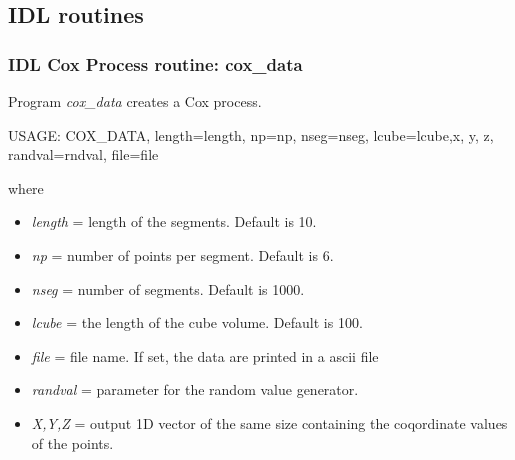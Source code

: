 \subsection{IDL routines}

\subsubsection{IDL Cox Process routine: cox\_data}
Program {\em cox\_data} creates a Cox process. 
\begin{center}
     USAGE:  COX\_DATA, length=length, np=np, nseg=nseg, lcube=lcube,x, y, z, 
randval=rndval, file=file
\end{center}
where
\begin{itemize}
\item {\em length} = length of the segments. Default is 10.
\item {\em np } = number of points per segment. Default is 6.
\item {\em nseg} = number of segments. Default is 1000.
\item {\em lcube } = the length of the cube volume. Default is 100.
\item {\em file } = file name. If set, the data are printed in a ascii
  file
\item {\em randval } = parameter for the random value generator.
\item {\em X,Y,Z} = output 1D vector of the same size containing the
  coqordinate values of the points.
\end{itemize}

